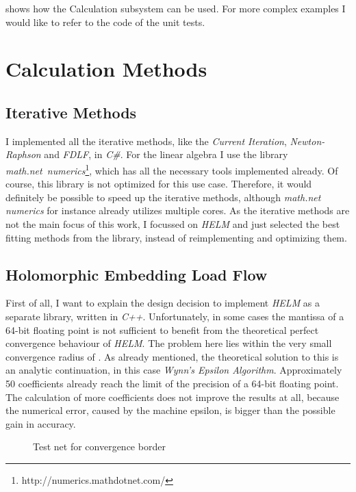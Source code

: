 shows how the Calculation subsystem can be used. For more complex examples I would like to refer to the code of the unit tests.

\section{Calculation Methods}
\label{sec:implementation_calculation_methods}

\subsection{Iterative Methods}
I implemented all the iterative methods, like the \emph{Current Iteration}, \emph{Newton-Raphson} and \emph{FDLF}, in \emph{C\#}. For the linear algebra I use the library \mbox{\emph{math.net numerics}\footnote{http://numerics.mathdotnet.com/}}, which has all the necessary tools implemented already. Of course, this library is not optimized for this use case. Therefore, it would definitely be possible to speed up the iterative methods, although \emph{math.net numerics} for instance already utilizes multiple cores. As the iterative methods are not the main focus of this work, I focussed on \emph{HELM} and just selected the best fitting methods from the library, instead of reimplementing and optimizing them.

\subsection{Holomorphic Embedding Load Flow}
\label{sec:implementation_helm}
First of all, I want to explain the design decision to implement \emph{HELM} as a separate library, written in \emph{C++}. Unfortunately, in some cases the mantissa of a 64-bit floating point is not sufficient to benefit from the theoretical perfect convergence behaviour of \emph{HELM}. The problem here lies within the very small convergence radius of . As already mentioned, the theoretical solution to this is an analytic continuation, in this case \emph{Wynn's Epsilon Algorithm}. Approximately 50 coefficients already reach the limit of the precision of a 64-bit floating point. The calculation of more coefficients does not improve the results at all, because the numerical error, caused by the machine epsilon, is bigger than the possible gain in accuracy.

\begin{figure}
	\centering
	
	\caption{Test net for convergence border}
	\label{fig:convergence_border_net}
\end{figure}


